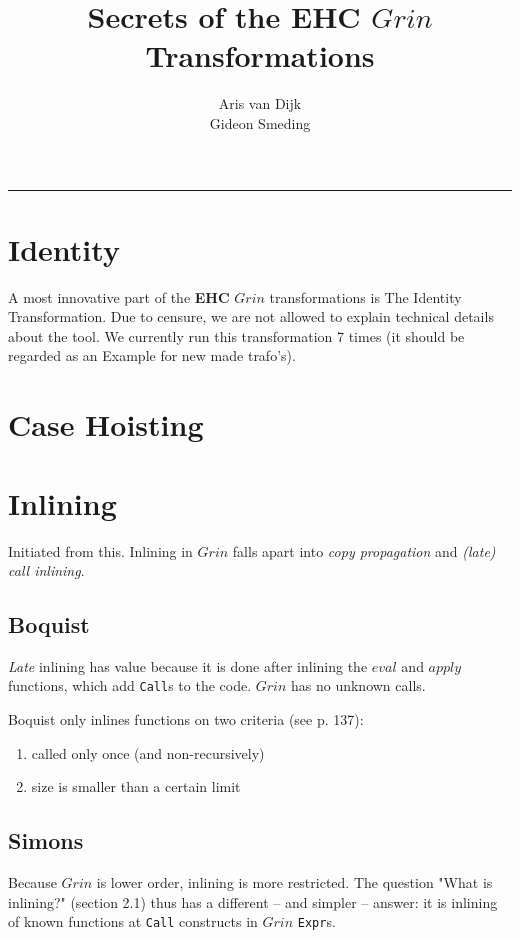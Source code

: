 \documentclass{article}
\begin{document}
\newcommand{\grin}{$Grin$ }
\newcommand{\ehc}{\textbf{EHC} }

\title{Secrets of the \ehc \grin Transformations}
\author{Aris van Dijk \\ Gideon Smeding}
\maketitle

\hrule

\tableofcontents

\newpage

\section{Identity}
A most innovative part of the \ehc \grin transformations is The Identity Transformation. Due to censure, we are not allowed to explain technical details about the tool. We currently run this transformation 7 times (it should be regarded as an Example for new made trafo's).

\section{Case Hoisting}


\section{Inlining}
Initiated from this\cite{Simons}. Inlining in \grin falls apart into \emph{copy propagation} and \emph{(late) call inlining}.

\subsection{Boquist}
\emph{Late} inlining has value because it is done after inlining the $eval$ and $apply$ functions, which add \texttt{Call}s to the code. \grin has no unknown calls.

Boquist only inlines functions on two criteria (see p. 137):
\begin{enumerate}
\item called only once (and non-recursively)
\item size is smaller than a certain limit
\end{enumerate}

\subsection{Simons}
Because \grin is lower order, inlining is more restricted. The question "What is inlining?" (section 2.1) thus has a different -- and simpler -- answer: it is inlining of known functions at \texttt{Call} constructs in \grin \texttt{Expr}s.
\end{document}
